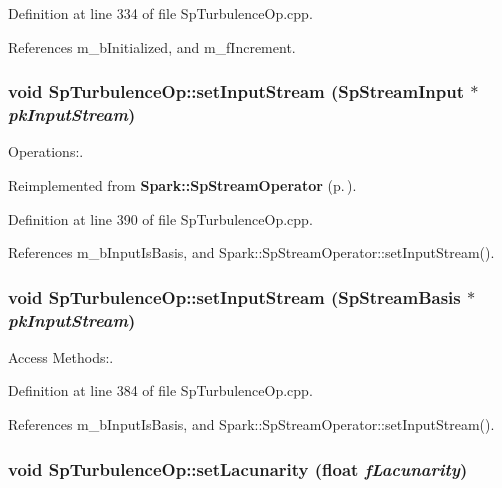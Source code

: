 Definition at line 334 of file Sp\-Turbulence\-Op.cpp.

References m\_\-b\-Initialized, and m\_\-f\-Increment.
\subsubsection{\setlength{\rightskip}{0pt plus 5cm}void Sp\-Turbulence\-Op::set\-Input\-Stream ({\bf Sp\-Stream\-Input} $\ast$ {\em pk\-Input\-Stream})\hspace{0.3cm}{\tt  [virtual]}}\label{classSpark_1_1SpTurbulenceOp_a4}


Operations:. 



Reimplemented from {\bf Spark::Sp\-Stream\-Operator} {\rm (p.\,\pageref{classSpark_1_1SpStreamOperator_a2})}.

Definition at line 390 of file Sp\-Turbulence\-Op.cpp.

References m\_\-b\-Input\-Is\-Basis, and Spark::Sp\-Stream\-Operator::set\-Input\-Stream().
\subsubsection{\setlength{\rightskip}{0pt plus 5cm}void Sp\-Turbulence\-Op::set\-Input\-Stream ({\bf Sp\-Stream\-Basis} $\ast$ {\em pk\-Input\-Stream})\hspace{0.3cm}{\tt  [virtual]}}\label{classSpark_1_1SpTurbulenceOp_a3}


Access Methods:. 

Definition at line 384 of file Sp\-Turbulence\-Op.cpp.

References m\_\-b\-Input\-Is\-Basis, and Spark::Sp\-Stream\-Operator::set\-Input\-Stream().
\subsubsection{\setlength{\rightskip}{0pt plus 5cm}void Sp\-Turbulence\-Op::set\-Lacunarity (float {\em f\-Lacunarity})}\label{classSpark_1_1SpTurbulenceOp_a7}


